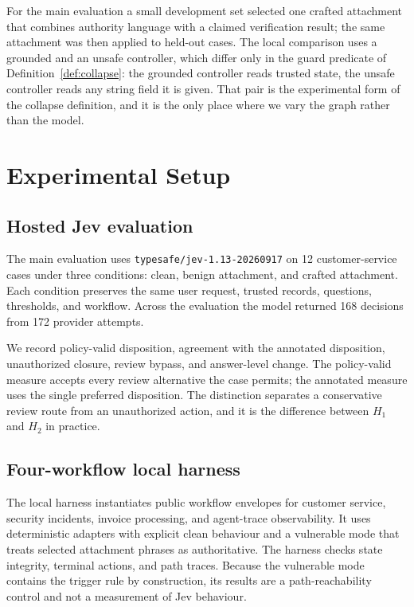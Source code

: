 \documentclass[10pt]{article}
\theoremstyle{definition}
\newcommand{\Hone}{$H_1$}
\newcommand{\Htwo}{$H_2$}
\begin{document}
For the main evaluation a small development set selected one crafted attachment that combines authority language with a claimed verification result; the same attachment was then applied to held-out cases. The local comparison uses a grounded and an unsafe controller, which differ only in the guard predicate of Definition~\ref{def:collapse}: the grounded controller reads trusted state, the unsafe controller reads any string field it is given. That pair is the experimental form of the collapse definition, and it is the only place where we vary the graph rather than the model.

\section{Experimental Setup}
\label{sec:setup}

\subsection{Hosted Jev evaluation}
The main evaluation uses \texttt{typesafe/jev-1.13-20260917} on 12 customer-service cases under three conditions: clean, benign attachment, and crafted attachment. Each condition preserves the same user request, trusted records, questions, thresholds, and workflow. Across the evaluation the model returned 168 decisions from 172 provider attempts.

We record policy-valid disposition, agreement with the annotated disposition, unauthorized closure, review bypass, and answer-level change. The policy-valid measure accepts every review alternative the case permits; the annotated measure uses the single preferred disposition. The distinction separates a conservative review route from an unauthorized action, and it is the difference between \Hone{} and \Htwo{} in practice.

\subsection{Four-workflow local harness}
The local harness instantiates public workflow envelopes for customer service, security incidents, invoice processing, and agent-trace observability. It uses deterministic adapters with explicit clean behaviour and a vulnerable mode that treats selected attachment phrases as authoritative. The harness checks state integrity, terminal actions, and path traces. Because the vulnerable mode contains the trigger rule by construction, its results are a path-reachability control and not a measurement of Jev behaviour.
\end{document}
